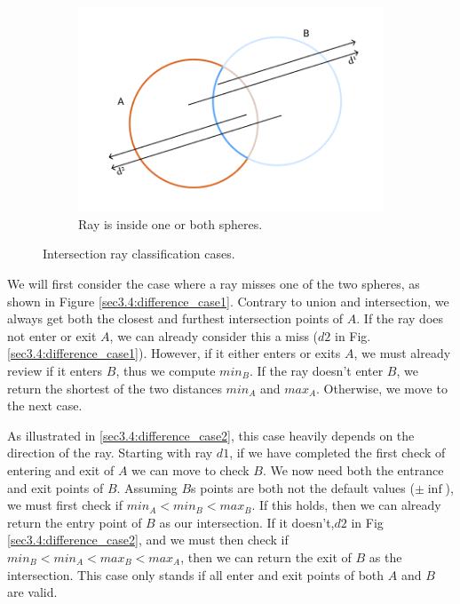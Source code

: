 \documentclass[a4paper,11pt,oneside]{article}
\begin{document}
\begin{figure}[ht]
\begin{subfigure}[b]{0.3\textwidth}
         \includegraphics[width=\textwidth]{section3/3.4/sphere_difference_case3.png}
         \caption{Ray is inside one or both spheres.}
         \label{sec3.4:difference_case3}
     \end{subfigure}
        \caption{Intersection ray classification cases.}
        \label{sec3.4:sphere_difference}
\end{figure}


We will first consider the case where a ray misses one of the two spheres, as shown in Figure \ref{sec3.4:difference_case1}.  
Contrary to union and intersection, we always get both the closest and furthest intersection points of $A$. If the ray does not enter or exit $A$, we can already consider this a miss ($d2$ in Fig. \ref{sec3.4:difference_case1}). However, if it either enters or exits $A$, we must already review if it enters $B$, thus we compute $min_B$. If the ray doesn't enter $B$, we return the shortest of the two distances $min_A$ and $max_A$. Otherwise, we move to the next case.

As illustrated in \ref{sec3.4:difference_case2}, this case heavily depends on the direction of the ray. Starting with ray $d1$, if we have completed the first check of entering and exit of $A$ we can move to check $B$. We now need both the entrance and exit points of $B$. Assuming $B$s points are both not the default values ($\pm\inf$), we must first check if $min_A < min_B < max_B$. If this holds, then we can already return the entry point of $B$ as our intersection. If it doesn't,$d2$ in Fig \ref{sec3.4:difference_case2}, and we must then check if $min_B < min_A < max_B < max_A$, then we can return the exit of $B$ as the intersection. This case only stands if all enter and exit points of both $A$ and $B$ are valid.
\end{document}
